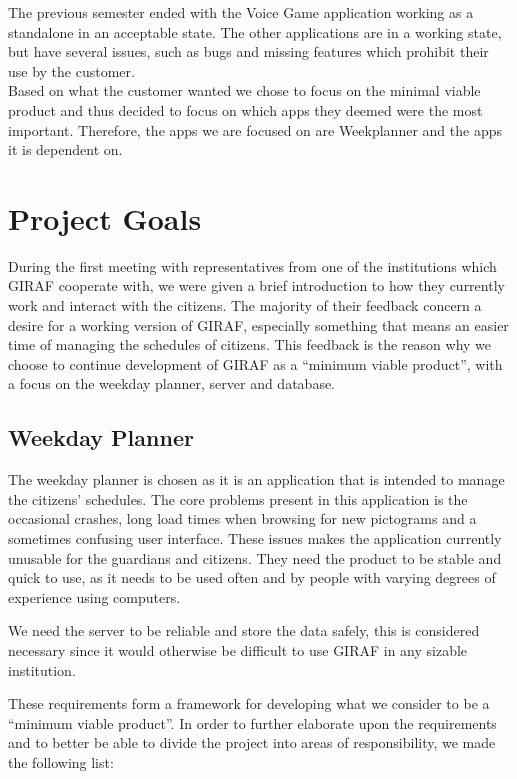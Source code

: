 The previous semester ended with the Voice Game application working as a
standalone in an acceptable state. The other applications are in a working
state, but have several issues, such as bugs and missing features which
prohibit their use by the customer.\\
Based on what the customer wanted we chose to focus on the minimal viable
product and thus decided to focus on which apps they deemed were the most
important. Therefore, the apps we are focused on are Weekplanner and the apps it
is dependent on. 
  
\section{Project Goals}
During the first meeting with representatives from one of the institutions which
GIRAF cooperate with, we were given a brief introduction to how they currently
work and interact with the citizens. The majority of their feedback concern a
desire for a working version of GIRAF, especially something that means an easier
time of managing the schedules of citizens. This feedback is the reason why we
choose to continue development of GIRAF as a ``minimum viable product'', with a
focus on the weekday planner, server and database.\nl

\subsection{Weekday Planner}

The weekday planner is chosen as it is an application that is intended to manage
the citizens' schedules. The core problems present in this application is
the occasional crashes, long load times when browsing for new pictograms and a
sometimes confusing user interface. These issues makes the application currently
unusable for the guardians and citizens. They need the product to be stable and
quick to use, as it needs to be used often and by people with varying degrees of
experience using computers.\nl







We need the server to be reliable and store the data safely, this is
  considered necessary since it would otherwise be difficult to use GIRAF in any
  sizable institution.



These requirements form a framework for developing what we consider to be a
``minimum viable product''. In order to further elaborate upon the requirements
and to better be able to divide the project into areas of responsibility, we
made the following list:

